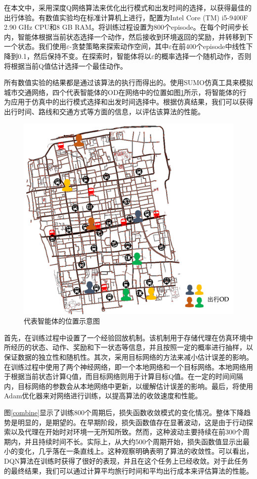 在本文中，采用深度Q网络算法来优化出行模式和出发时间的选择，以获得最佳的出行体验。有数值实验均在标准计算机上进行，配置为Intel Core (TM) i5-9400F 2.90 GHz CPU和8 GB RAM。将训练过程设置为800个episode。在每个时间步长内，智能体根据当前状态选择一个动作，然后接收到环境返回的奖励，并转移到下一个状态。我们使用$\varepsilon$-贪婪策略来探索动作空间，其中$\varepsilon$在前400个episode中线性下降到0.1，然后保持不变。在探索时，智能体将以$\varepsilon$的概率选择一个随机动作，否则将根据当前Q值估计选择一个最佳动作。

所有数值实验的结果都是通过该算法的执行而得出的。使用SUMO仿真工具来模拟城市交通网络，四个代表智能体的OD在网络中的位置如图\ref{agent_map}所示，将智能体的行为应用于仿真中的出行模式选择和出发时间选择中。根据仿真结果，我们可以获得出行时间、路线和交通方式等方面的信息，以评估该算法的性能。
\begin{figure}
  \centering
  \includegraphics[width=.75\linewidth]{figures/content/agent_map.png}
  \caption{代表智能体的位置示意图}
  \label{agent_map}
\end{figure}

首先，在训练过程中设置了一个经验回放机制。该机制用于存储代理在仿真环境中所经历的状态、动作、奖励和下一状态等信息，并且按照一定的概率进行抽样，以保证数据的独立性和随机性。其次，采用目标网络的方法来减小估计误差的影响。在训练过程中使用了两个神经网络，即一个本地网络和一个目标网络。本地网络用于根据当前状态计算Q值，而目标网络则用于计算目标Q值。在一定的时间间隔内，目标网络的参数会从本地网络中更新，以缓解估计误差的影响。最后，将使用Adam优化器来对网络进行训练，以提高算法的收敛速度和性能。

图\ref{combine}显示了训练800个周期后，损失函数收敛模式的变化情况。整体下降趋势是明显的，是期望的。在早期阶段，损失函数值存在显著波动，这是由于行动探索以及代理在开始时对环境一无所知所致。然而，这种波动主要持续在前300个周期内，并且持续时间不长。实际上，从大约500个周期开始，损失函数值显示出最小的变化，几乎落在一条直线上。这种观察明确表明了算法的收敛性。可以看出，DQN算法在训练时获得了很好的表现，并且在这个任务上已经收敛。对于此任务的最终结果，我们可以通过计算平均旅行时间和平均出行成本来评估算法的性能。

